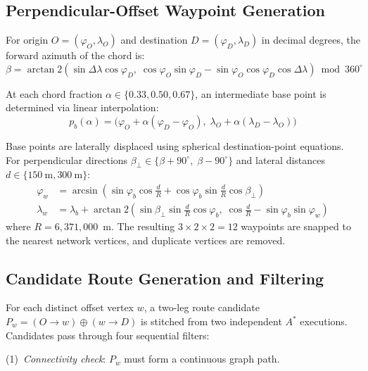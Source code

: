 \documentclass[11pt,conference]{IEEEtran}
\begin{document}
\subsection{Perpendicular-Offset Waypoint Generation}

For origin $O=(\varphi_O,\lambda_O)$ and destination $D=(\varphi_D,\lambda_D)$ in decimal degrees, the forward azimuth of the chord is:
\begin{equation}
  \beta = \arctan2\!\left(\sin\Delta\lambda\cos\varphi_D,\;
         \cos\varphi_O\sin\varphi_D - \sin\varphi_O\cos\varphi_D\cos\Delta\lambda\right) \bmod 360^\circ
  \label{eq:bearing}
\end{equation}

At each chord fraction $\alpha \in \{0.33, 0.50, 0.67\}$, an intermediate base point is determined via linear interpolation:
\begin{equation}
  p_b(\alpha) = \bigl(\varphi_O + \alpha(\varphi_D-\varphi_O),\;\lambda_O + \alpha(\lambda_D-\lambda_O)\bigr)
  \label{eq:chord_point}
\end{equation}

Base points are laterally displaced using spherical destination-point equations.
For perpendicular directions $\beta_\perp \in \{\beta{+}90^\circ,\;\beta{-}90^\circ\}$ and lateral distances $d \in \{150~\text{m}, 300~\text{m}\}$:
\begin{align}
  \varphi_w &= \arcsin\!\left(\sin\varphi_b\cos\tfrac{d}{R} + \cos\varphi_b\sin\tfrac{d}{R}\cos\beta_\perp\right) \label{eq:dest_lat}\\
  \lambda_w &= \lambda_b + \arctan2\!\left(\sin\beta_\perp\sin\tfrac{d}{R}\cos\varphi_b,\;
              \cos\tfrac{d}{R}-\sin\varphi_b\sin\varphi_w\right) \label{eq:dest_lng}
\end{align}
where $R = 6{,}371{,}000$~m.
The resulting $3\times2\times2 = 12$ waypoints are snapped to the nearest network vertices, and duplicate vertices are removed.

\subsection{Candidate Route Generation and Filtering}

For each distinct offset vertex $w$, a two-leg route candidate $P_w = (O\to w)\oplus(w\to D)$ is stitched from two independent $A^*$ executions.
Candidates pass through four sequential filters:

(1)~\textit{Connectivity check}: $P_w$ must form a continuous graph path.
\end{document}
